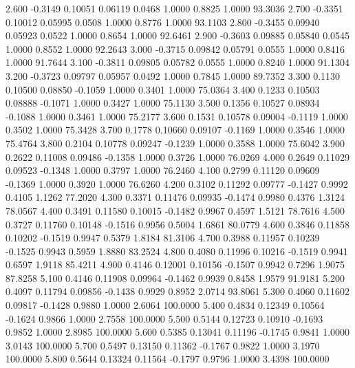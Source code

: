    2.600  -0.3149   0.10051   0.06119   0.0468   1.0000   0.8825   1.0000  93.3036
   2.700  -0.3351   0.10012   0.05995   0.0508   1.0000   0.8776   1.0000  93.1103
   2.800  -0.3455   0.09940   0.05923   0.0522   1.0000   0.8654   1.0000  92.6461
   2.900  -0.3603   0.09885   0.05840   0.0545   1.0000   0.8552   1.0000  92.2643
   3.000  -0.3715   0.09842   0.05791   0.0555   1.0000   0.8416   1.0000  91.7644
   3.100  -0.3811   0.09805   0.05782   0.0555   1.0000   0.8240   1.0000  91.1304
   3.200  -0.3723   0.09797   0.05957   0.0492   1.0000   0.7845   1.0000  89.7352
   3.300   0.1130   0.10500   0.08850  -0.1059   1.0000   0.3401   1.0000  75.0364
   3.400   0.1233   0.10503   0.08888  -0.1071   1.0000   0.3427   1.0000  75.1130
   3.500   0.1356   0.10527   0.08934  -0.1088   1.0000   0.3461   1.0000  75.2177
   3.600   0.1531   0.10578   0.09004  -0.1119   1.0000   0.3502   1.0000  75.3428
   3.700   0.1778   0.10660   0.09107  -0.1169   1.0000   0.3546   1.0000  75.4764
   3.800   0.2104   0.10778   0.09247  -0.1239   1.0000   0.3588   1.0000  75.6042
   3.900   0.2622   0.11008   0.09486  -0.1358   1.0000   0.3726   1.0000  76.0269
   4.000   0.2649   0.11029   0.09523  -0.1348   1.0000   0.3797   1.0000  76.2460
   4.100   0.2799   0.11120   0.09609  -0.1369   1.0000   0.3920   1.0000  76.6260
   4.200   0.3102   0.11292   0.09777  -0.1427   0.9992   0.4105   1.1262  77.2020
   4.300   0.3371   0.11476   0.09935  -0.1474   0.9980   0.4376   1.3124  78.0567
   4.400   0.3491   0.11580   0.10015  -0.1482   0.9967   0.4597   1.5121  78.7616
   4.500   0.3727   0.11760   0.10148  -0.1516   0.9956   0.5004   1.6861  80.0779
   4.600   0.3846   0.11858   0.10202  -0.1519   0.9947   0.5379   1.8184  81.3106
   4.700   0.3988   0.11957   0.10239  -0.1525   0.9943   0.5959   1.8880  83.2524
   4.800   0.4080   0.11996   0.10216  -0.1519   0.9941   0.6597   1.9118  85.4211
   4.900   0.4146   0.12001   0.10156  -0.1507   0.9942   0.7296   1.9075  87.8258
   5.100   0.4146   0.11908   0.09964  -0.1462   0.9939   0.8458   1.9579  91.9181
   5.200   0.4097   0.11794   0.09856  -0.1438   0.9929   0.8952   2.0714  93.8061
   5.300   0.4060   0.11602   0.09817  -0.1428   0.9880   1.0000   2.6064 100.0000
   5.400   0.4834   0.12349   0.10564  -0.1624   0.9866   1.0000   2.7558 100.0000
   5.500   0.5144   0.12723   0.10910  -0.1693   0.9852   1.0000   2.8985 100.0000
   5.600   0.5385   0.13041   0.11196  -0.1745   0.9841   1.0000   3.0143 100.0000
   5.700   0.5497   0.13150   0.11362  -0.1767   0.9822   1.0000   3.1970 100.0000
   5.800   0.5644   0.13324   0.11564  -0.1797   0.9796   1.0000   3.4398 100.0000
